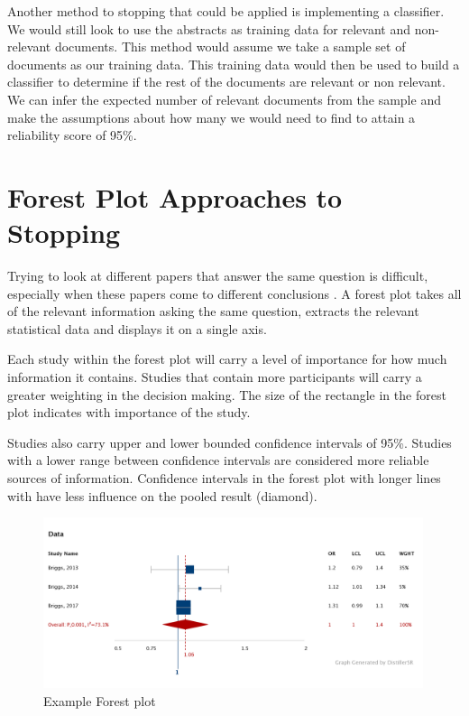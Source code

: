 Another method to stopping that could be applied is implementing a classifier. We would still look to use the abstracts as training data for relevant and non-relevant documents. This method would assume we take a sample set of documents as our training data. This training data would then be used to build a classifier to determine if the rest of the documents are relevant or non relevant. We can infer the expected number of relevant documents from the sample and make the assumptions about how many we would need to find to attain a reliability score of 95\%.


\section{Forest Plot Approaches to Stopping}

Trying to look at different papers that answer the same question is difficult, especially when these papers come to different conclusions \cite{forestplots}. A forest plot takes all of the relevant information asking the same question, extracts the relevant statistical data and displays it on a single axis. 

Each study within the forest plot will carry a level of importance for how much information it contains. Studies that contain more participants will carry a greater weighting in the decision making. The size of the rectangle in the forest plot indicates with importance of the study.

Studies also carry upper and lower bounded confidence intervals of 95\%. Studies with a lower range between confidence intervals are considered more reliable sources of information. Confidence intervals in the forest plot with longer lines with have less influence on the pooled result (diamond).


\begin{figure}[H]
\center
\includegraphics[height=5cm]{figures/forest.png}
\caption{Example Forest plot}
\end{figure}


